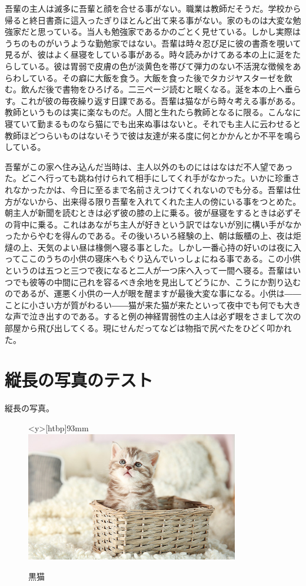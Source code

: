 \documentclass[]{ltjtbook}
\begin{document}
吾輩の主人は滅多に吾輩と顔を合せる事がない。職業は教師だそうだ。学校から帰ると終日書斎に這入ったぎりほとんど出て来る事がない。家のものは大変な勉強家だと思っている。当人も勉強家であるかのごとく見せている。しかし実際はうちのものがいうような勤勉家ではない。吾輩は時々忍び足に彼の書斎を覗いて見るが、彼はよく昼寝をしている事がある。時々読みかけてある本の上に涎をたらしている。彼は胃弱で皮膚の色が淡黄色を帯びて弾力のない不活溌な徴候をあらわしている。その癖に大飯を食う。大飯を食った後でタカジヤスターゼを飲む。飲んだ後で書物をひろげる。二三ページ読むと眠くなる。涎を本の上へ垂らす。これが彼の毎夜繰り返す日課である。吾輩は猫ながら時々考える事がある。教師というものは実に楽なものだ。人間と生れたら教師となるに限る。こんなに寝ていて勤まるものなら猫にでも出来ぬ事はないと。それでも主人に云わせると教師ほどつらいものはないそうで彼は友達が来る度に何とかかんとか不平を鳴らしている。

吾輩がこの家へ住み込んだ当時は、主人以外のものにははなはだ不人望であった。どこへ行っても跳ね付けられて相手にしてくれ手がなかった。いかに珍重されなかったかは、今日に至るまで名前さえつけてくれないのでも分る。吾輩は仕方がないから、出来得る限り吾輩を入れてくれた主人の傍にいる事をつとめた。朝主人が新聞を読むときは必ず彼の膝の上に乗る。彼が昼寝をするときは必ずその背中に乗る。これはあながち主人が好きという訳ではないが別に構い手がなかったからやむを得んのである。その後いろいろ経験の上、朝は飯櫃の上、夜は炬燵の上、天気のよい昼は椽側へ寝る事とした。しかし一番心持の好いのは夜に入ってここのうちの小供の寝床へもぐり込んでいっしょにねる事である。この小供というのは五つと三つで夜になると二人が一つ床へ入って一間へ寝る。吾輩はいつでも彼等の中間に己れを容るべき余地を見出してどうにか、こうにか割り込むのであるが、運悪く小供の一人が眼を醒ますが最後大変な事になる。小供は――ことに小さい方が質がわるい――猫が来た猫が来たといって夜中でも何でも大きな声で泣き出すのである。すると例の神経胃弱性の主人は必ず眼をさまして次の部屋から飛び出してくる。現にせんだってなどは物指で尻ぺたをひどく叩かれた。

\chapter{縦長の写真のテスト}

縦長の写真。

\begin{figure}
\begin{center}
\begin{minipage}<y>[htbp]{93mm}
\centering\includegraphics[width=93mm]{./pic/cat003.jpg}
\caption{黒猫}
\end{minipage}
\end{center}
\end{figure}
\end{document}
